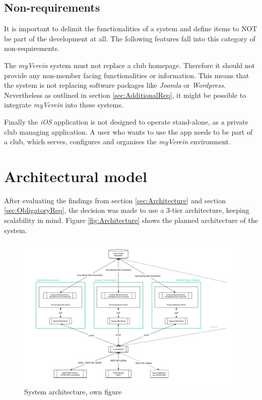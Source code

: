 \subsection{Non-requirements}

It is important to delimit the functionalities of a system and define items to NOT be part of the development at all. The following features fall into this category of non-requirements.

The \emph{myVerein} system must not replace a club homepage. Therefore it should not provide any non-member facing functionalities or information. This means that the system is not replacing software packages like \emph{Joomla} or \emph{Wordpress}. Nevertheless as outlined in section \vref{sec:AdditionalReq}, it might be possible to integrate \emph{myVerein} into these systems.

Finally the \emph{iOS} application is not designed to operate stand-alone, as a private club managing application. A user who wants to use the app needs to be part of a club, which serves, configures and organises the \emph{myVerein} environment.

\section{Architectural model}
\label{sec:ArchitecturalModel}
After evaluating the findings from section \vref{sec:Architecture} and section \vref{sec:ObligatoryReq}, the decision was made to use a 3-tier architecture, keeping scalability in mind. Figure \vref{fig:Architecture} shows the planned architecture of the system. 

\begin{figure}[h]
  	\centering
  	\includegraphics[width=0.95\linewidth]{./images/architecture.png}
  	\caption{System architecture, own figure}
	\label{fig:Architecture}
\end{figure}

